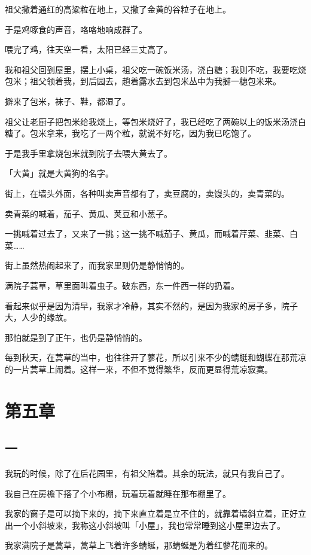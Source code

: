 \documentclass[UTF8]{ctexart}
\begin{document}
祖父撒着通红的高粱粒在地上，又撒了金黄的谷粒子在地上。

于是鸡啄食的声音，咯咯地响成群了。

喂完了鸡，往天空一看，太阳已经三丈高了。

我和祖父回到屋里，摆上小桌，祖父吃一碗饭米汤，浇白糖；我则不吃，我要吃烧包米；祖父领着我，到后园去，趟着露水去到包米丛中为我擗一穗包米来。

擗来了包米，袜子、鞋，都湿了。

祖父让老厨子把包米给我烧上，等包米烧好了，我已经吃了两碗以上的饭米汤浇白糖了。包米拿来，我吃了一两个粒，就说不好吃，因为我已吃饱了。

于是我手里拿烧包米就到院子去喂大黄去了。

「大黄」就是大黄狗的名字。

街上，在墙头外面，各种叫卖声音都有了，卖豆腐的，卖馒头的，卖青菜的。

卖青菜的喊着，茄子、黄瓜、荚豆和小葱子。

一挑喊着过去了，又来了一挑；这一挑不喊茄子、黄瓜，而喊着芹菜、韭菜、白菜……

街上虽然热闹起来了，而我家里则仍是静悄悄的。

满院子蒿草，草里面叫着虫子。破东西，东一件西一样的扔着。

看起来似乎是因为清早，我家才冷静，其实不然的，是因为我家的房子多，院子大，人少的缘故。

那怕就是到了正午，也仍是静悄悄的。

每到秋天，在蒿草的当中，也往往开了蓼花，所以引来不少的蜻蜓和蝴蝶在那荒凉的一片蒿草上闹着。这样一来，不但不觉得繁华，反而更显得荒凉寂寞。

\section{第五章}

\subsection{一}

我玩的时候，除了在后花园里，有祖父陪着。其余的玩法，就只有我自己了。

我自己在房檐下搭了个小布棚，玩着玩着就睡在那布棚里了。

我家的窗子是可以摘下来的，摘下来直立着是立不住的，就靠着墙斜立着，正好立出一个小斜坡来，我称这小斜坡叫「小屋」，我也常常睡到这小屋里边去了。

我家满院子是蒿草，蒿草上飞着许多蜻蜒，那蜻蜒是为着红蓼花而来的。
\end{document}
